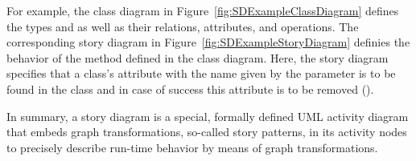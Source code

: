 For example, the class diagram in Figure~\ref{fig:SDExampleClassDiagram} defines the types  and  as well as their relations, attributes, and operations.
The corresponding story diagram in Figure~\ref{fig:SDExampleStoryDiagram} definies the behavior of the  method defined in the class diagram.
Here, the story diagram specifies that a class's attribute with the name given by the parameter  is to be found in the class and in case of success this attribute is to be removed (\destroy).

In summary, a story diagram is a special, formally defined UML activity diagram
that embeds graph transformations, so-called story patterns, in its activity nodes
to precisely describe run-time behavior by means of graph transformations.

